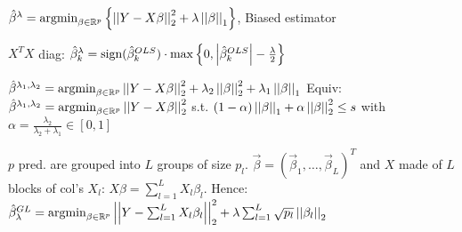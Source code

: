 \vspace{-4pt}

$\hat{\beta}^\lambda = \text{argmin}_{\beta \in \mathbb{R}^p} \left\{ \left\vert\left\vert Y - X \beta \right\vert\right\vert_2^2 + \lambda \left\vert\left\vert \beta \right\vert\right\vert_1 \right\}$, 
Biased estimator

\vspace{2pt}

 $X^T X$ diag: $\hat{\beta}_k^\lambda = \text{sign}(\hat{\beta}_k^{OLS}) \cdot \max \left\{ 0,\left\vert \hat{\beta}_k^{OLS} \right\vert-\frac{\lambda}{2} \right\}$

\vspace{2pt}

$\hat{\beta}^{\lambda_1,\lambda_2} = \text{argmin}_{\beta \in \mathbb{R}^p} \left\vert\left\vert Y - X \beta \right\vert\right\vert_2^2 + \lambda_2 \left\vert\left\vert \beta \right\vert\right\vert_2^2 + \lambda_1 \left\vert\left\vert \beta \right\vert\right\vert_1$
Equiv: $\hat{\beta}^{\lambda_1,\lambda_2} = \text{argmin}_{\beta \in \mathbb{R}^p} \left\vert\left\vert Y - X \beta \right\vert\right\vert_2^2$ s.t. $(1-\alpha) \left\vert\left\vert \beta \right\vert\right\vert_1 + \alpha \left\vert\left\vert \beta \right\vert\right\vert_2^2 \leq s$
with $\alpha = \frac{\lambda_2}{\lambda_2 + \lambda_1} \in [0,1]$

\vspace{2pt}

$p$ pred. are grouped into $L$ groups of size $p_l$. $\vec{\beta} = (\vec{\beta}_1,\dots,\vec{\beta}_L)^T$ and $X$ made of $L$ blocks of col's $X_l$: $X \beta = \sum_{l=1}^{L} X_l \beta_l$. Hence:
$\hat{\beta}^{GL}_\lambda = \text{argmin}_{\beta \in \mathbb{R}^p} \left\vert\left\vert Y - \sum_{l=1}^{L} X_l \beta_l \right\vert\right\vert_2^2 + \lambda \sum_{l=1}^{L} \sqrt{p_l} \left\vert\left\vert \beta_l \right\vert\right\vert_2$
